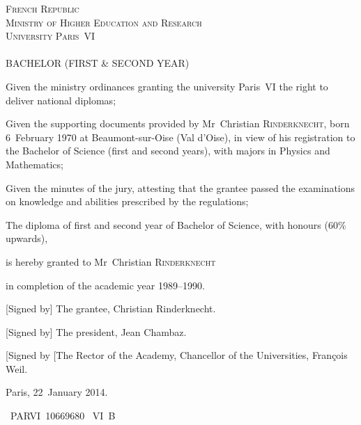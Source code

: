 \documentclass[a4paper,11pt,twoside]{article}
\begin{document}
\begin{center}
\textsc{French Republic}\\
\textsc{Ministry of Higher Education and Research}\\
\textsc{University Paris~VI}\\
\ \\
\textsc{\Large BACHELOR (FIRST \& SECOND YEAR)}
\end{center}

\bigskip

Given the ministry ordinances granting the university Paris~VI the
right to deliver national diplomas;

\bigskip

Given the supporting documents provided by Mr~Christian
\textsc{Rinderknecht}, born 6~February 1970 at Beaumont-sur-Oise (Val
d'Oise), in view of his registration to the Bachelor of Science (first
and second years), with majors in Physics and Mathematics;

\bigskip

Given the minutes of the jury, attesting that the grantee passed the
examinations on knowledge and abilities prescribed by the regulations;

\bigskip

The diploma of first and second year of Bachelor of Science, with
honours (60\% upwards),

\medskip

is hereby granted to Mr~Christian \textsc{Rinderknecht}

\medskip

in completion of the academic year 1989--1990.

\bigskip

[Signed by] The grantee, Christian Rinderknecht.

[Signed by] The president, Jean Chambaz.

[Signed by [The Rector of the Academy, Chancellor of the Universities,
    François Weil.

\bigskip

Paris, 22~January 2014.

\bigskip

\textnumero~PARVI~10669680 ~VI~B

\thispagestyle{empty}
\end{document}
